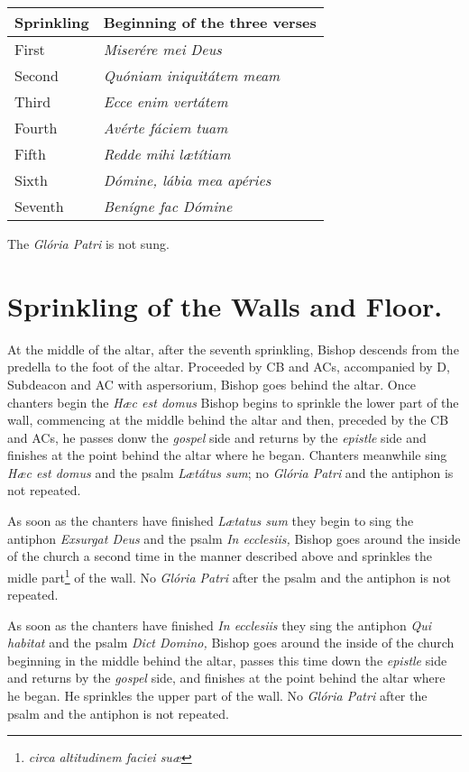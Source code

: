\documentclass[letterpaper]{report}
\begin{document}
{\begin{tabular}{l l}
    \toprule
    Sprinkling & Beginning of the three verses \\
    \midrule
    First & \textit{Miserére mei Deus} \\
    Second & \textit{Quóniam iniquitátem meam} \\
    Third & \textit{Ecce enim vertátem} \\
    Fourth & \textit{Avérte fáciem tuam} \\
    Fifth & \textit{Redde mihi l\ae títiam} \\
    Sixth & \textit{Dómine, lábia mea apéries} \\
    Seventh & \textit{Benígne fac Dómine} \\
    \bottomrule
\end{tabular}

The \textit{Glória Patri} is not sung.

\section{Sprinkling of the Walls and Floor.}

\rubric At the middle of the altar, after the seventh sprinkling, Bishop descends
from the predella to the foot of the altar. Proceeded by CB and ACs,
accompanied by D, Subdeacon and AC with aspersorium, Bishop goes behind the altar. Once
chanters begin the \textit{H\ae c est domus} Bishop begins to sprinkle the lower
part of the wall, commencing at the middle behind the altar and then, preceded
by the CB and ACs, he passes donw the \textit{gospel} side and returns by the
\textit{epistle} side and finishes at the point behind the altar where he
began. Chanters meanwhile sing \textit{H\ae c est domus} and the psalm
\textit{L\ae tátus sum}; no \textit{Glória Patri} and the antiphon is not
repeated.

\rubric As soon as the chanters have finished \textit{L\ae tatus sum} they
begin to sing the antiphon \textit{Exsurgat Deus} and the psalm \textit{In
ecclesiis,} Bishop goes around the inside of the church a second time in the manner
described above and sprinkles the midle part\footnote{\textit{circa altitudinem
faciei su\ae}} of the wall. No \textit{Glória Patri} after the psalm and the
antiphon is not repeated.

\rubric As soon as the chanters have finished \textit{In ecclesiis} they sing
the antiphon \textit{Qui habitat} and the psalm \textit{Dict Domino,} Bishop goes
around the inside of the church beginning in the middle behind the altar,
passes this time down the \textit{epistle} side and returns by the
\textit{gospel} side, and finishes at the point behind the altar where he
began. He sprinkles the upper part of the wall. No \textit{Glória Patri} after
the psalm and the antiphon is not repeated.

}
\end{document}

